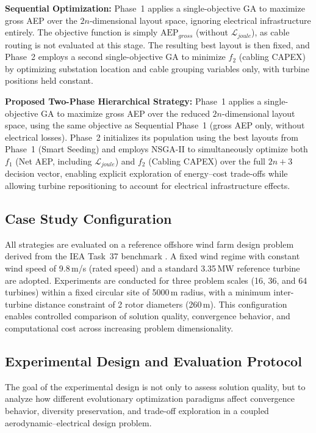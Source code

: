 \documentclass[format=sigconf,anonymous=true,review=true]{acmart}
\begin{document}
\textbf{Sequential Optimization:} Phase~1 applies a single-objective GA to maximize gross AEP over the $2n$-dimensional layout space, ignoring electrical infrastructure entirely. The objective function is simply $\text{AEP}_{gross}$ (without $\mathcal{L}_{joule}$), as cable routing is not evaluated at this stage. The resulting best layout is then fixed, and Phase~2 employs a second single-objective GA to minimize $f_2$ (cabling CAPEX) by optimizing substation location and cable grouping variables only, with turbine positions held constant.

\textbf{Proposed Two-Phase Hierarchical Strategy:} Phase~1 applies a single-objective GA to maximize gross AEP over the reduced $2n$-dimensional layout space, using the same objective as Sequential Phase~1 (gross AEP only, without electrical losses). Phase~2 initializes its population using the best layouts from Phase~1 (Smart Seeding) and employs NSGA-II \cite{Deb2002NSGA2} to simultaneously optimize both $f_1$ (Net AEP, including $\mathcal{L}_{joule}$) and $f_2$ (Cabling CAPEX) over the full $2n+3$ decision vector, enabling explicit exploration of energy--cost trade-offs while allowing turbine repositioning to account for electrical infrastructure effects.

\subsection{Case Study Configuration}

All strategies are evaluated on a reference offshore wind farm design problem derived from the IEA Task~37 benchmark \cite{Baker2019Best}. A fixed wind regime with constant wind speed of 9.8\,m/s (rated speed) and a standard 3.35\,MW reference turbine are adopted. Experiments are conducted for three problem scales (16, 36, and 64 turbines) within a fixed circular site of 5000\,m radius, with a minimum inter-turbine distance constraint of 2 rotor diameters (260\,m). This configuration enables controlled comparison of solution quality, convergence behavior, and computational cost across increasing problem dimensionality.


\subsection{Experimental Design and Evaluation Protocol}
\label{sec:experimental_design}

The goal of the experimental design is not only to assess solution quality, but to analyze how different evolutionary optimization paradigms affect convergence behavior, diversity preservation, and trade-off exploration in a coupled aerodynamic--electrical design problem.
\end{document}
